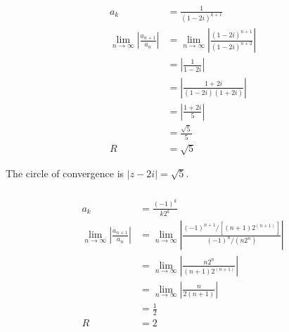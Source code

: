 \documentclass{article}
\begin{document}
\begin{align*}
  a_k                                                              & = \frac{1}{(1 - 2 i)^{k + 1}}                                                            \\
  \lim_{n \rightarrow \infty} \left| \frac{a_{n + 1}}{a_n} \right| & = \lim_{n \rightarrow \infty} \left| \frac{(1 - 2 i)^{n + 1}}{(1 - 2 i)^{n + 2}} \right| \\
                                                                   & = \left| \frac{1}{1 - 2 i} \right|                                                       \\
                                                                   & = \left| \frac{1 + 2 i}{(1 - 2 i) (1 + 2 i)} \right|                                     \\
                                                                   & = \left| \frac{1 + 2 i}{5} \right|                                                       \\
                                                                   & = \frac{\sqrt{5}}{5}                                                                     \\
  R                                                                & = \sqrt{5}
\end{align*}

The circle of convergence is $|z - 2 i| = \sqrt{5}$.

\setcounter{subsubsection}{22}
\subsubsection{}

\begin{align*}
  a_k                                                              & = \frac{(-1)^k}{k 2^k}                                                                                     \\
  \lim_{n \rightarrow \infty} \left| \frac{a_{n + 1}}{a_n} \right| & = \lim_{n \rightarrow \infty} \left| \frac{(-1)^{n + 1} / [(n + 1) 2^{(n + 1)}]}{(-1)^n / (n 2^n)} \right| \\
                                                                   & = \lim_{n \rightarrow \infty} \left| \frac{n 2^n}{(n + 1) 2^{(n + 1)}} \right|                             \\
                                                                   & = \lim_{n \rightarrow \infty} \left| \frac{n}{2 (n + 1)} \right|                                           \\
                                                                   & = \frac{1}{2}                                                                                              \\
  R                                                                & = 2
\end{align*}
\end{document}
